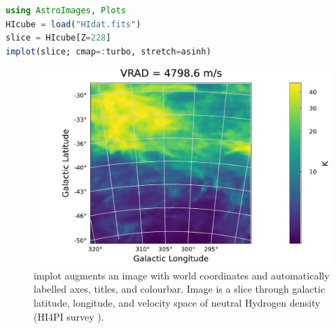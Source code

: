 \documentclass{juliacon}
\begin{document}
\begin{lstlisting}[language = Julia]
using AstroImages, Plots
HIcube = load("HIdat.fits")
slice = HIcube[Z=228]
implot(slice; cmap=:turbo, stretch=asinh)
\end{lstlisting}
\vspace{-0.8cm}
\begin{figure}[hbt!]
    \centerline{\includegraphics[width=\columnwidth]{hidatplot.pdf}}
    \caption{implot augments an image with world coordinates and automatically labelled axes, titles, and colourbar. Image is a slice through galactic latitude, longitude, and velocity space of neutral Hydrogen density (HI4PI survey \cite{2016A&A...594A.116H}).}
      \label{fig:cube-slice}
\end{figure}
\FloatBarrier 






\end{document}
